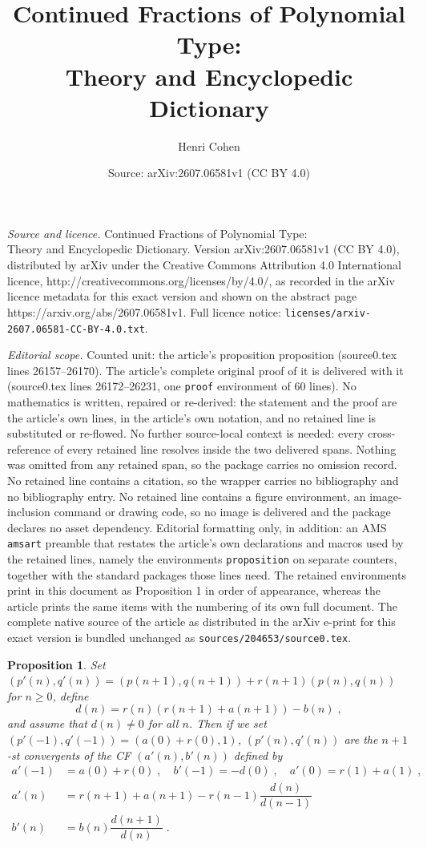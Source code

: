\documentclass[10pt,a4paper]{amsart}
\title{Continued Fractions of Polynomial Type:\\ Theory and Encyclopedic Dictionary}
\author{Henri Cohen}
\date{Source: arXiv:2607.06581v1 (CC BY 4.0)}
\newtheorem{proposition}{Proposition}
\begin{document}
\maketitle

\noindent\emph{Source and licence.} Continued Fractions of Polynomial Type:\\ Theory and Encyclopedic Dictionary. Version arXiv:2607.06581v1 (CC BY 4.0), distributed by arXiv under the Creative Commons Attribution 4.0 International licence, http://creativecommons.org/licenses/by/4.0/, as recorded in the arXiv licence metadata for this exact version and shown on the abstract page https://arxiv.org/abs/2607.06581v1. Full licence notice: \texttt{licenses/arxiv-2607.06581-CC-BY-4.0.txt}.\par\smallskip

\noindent\textit{Editorial scope.} Counted unit: the article's proposition proposition (source0.tex lines 26157--26170). The article's complete original proof of it is delivered with it (source0.tex lines 26172--26231, one \texttt{proof} environment of 60 lines). No mathematics is written, repaired or re-derived: the statement and the proof are the article's own lines, in the article's own notation, and no retained line is substituted or re-flowed.  No further source-local context is needed: every cross-reference of every retained line resolves inside the two delivered spans.  Nothing was omitted from any retained span, so the package carries no omission record.  No retained line contains a citation, so the wrapper carries no bibliography and no bibliography entry.  No retained line contains a figure environment, an image-inclusion command or drawing code, so no image is delivered and the package declares no asset dependency.  Editorial formatting only, in addition: an AMS \texttt{amsart} preamble that restates the article's own declarations and macros used by the retained lines, namely the environments \texttt{proposition} on separate counters, together with the standard packages those lines need.  The retained environments print in this document as Proposition 1 in order of appearance, whereas the article prints the same items with the numbering of its own full document.  The complete native source of the article as distributed in the arXiv e-print for this exact version is bundled unchanged as \texttt{sources/204653/source0.tex}.
\begin{proposition}
  Set $(p'(n),q'(n))=(p(n+1),q(n+1))+r(n+1)(p(n),q(n))$ for
  $n\ge0$, define
  $$d(n)=r(n)(r(n+1)+a(n+1))-b(n)\;,$$
  and assume that $d(n)\ne0$ for all $n$.
  Then if we set $(p'(-1),q'(-1))=(a(0)+r(0),1)$,
  $(p'(n),q'(n))$ are the $n+1$-st convergents of the CF $(a'(n),b'(n))$
  defined by
  \begin{align*}
    a'(-1)&=a(0)+r(0)\;,\quad b'(-1)=-d(0)\;,\quad a'(0)=r(1)+a(1)\;,\\
    a'(n)&=r(n+1)+a(n+1)-r(n-1)\dfrac{d(n)}{d(n-1)}\\
    b'(n)&=b(n)\dfrac{d(n+1)}{d(n)}\;.
  \end{align*}
\end{proposition}
\end{document}
